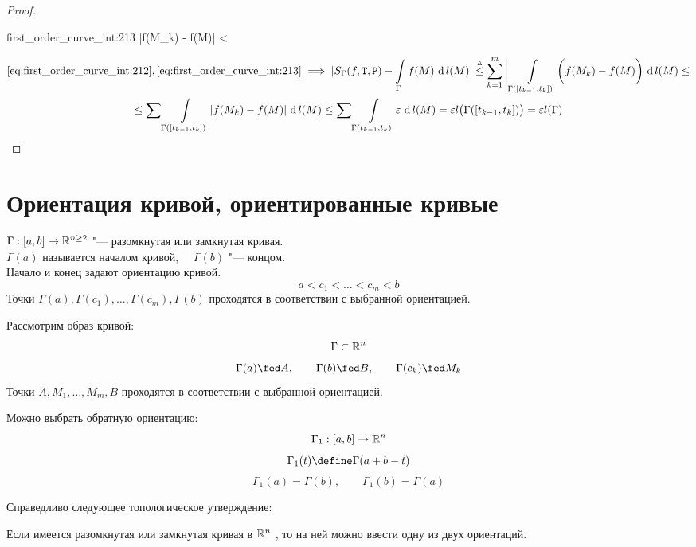 \begin{proof}
	\begin{equ}{first_order_curve_int:213}
		 \implies |f(M_k) - f(M)| < \veps
	\end{equ}
	\begin{multline*}
		\eref{first_order_curve_int:212}, \eref{first_order_curve_int:213} \implies |S_\Gamma(f, \Teq, \Par) - \cint\Gamma{f(M)}| \trile \sum_{k = 1}^m \bigg| \cint{\Gamma([t_{k - 1}, t_k])}{\bigg( f(M_k) - f(M) \bigg)} \le \\
		\le \sum \cint{\Gamma([t_{k - 1}, t_k])}{|f(M_k) - f(M)|} \le \sum \cint{\Gamma(t_{k - 1}, t_k)}\veps = \veps l \big( \Gamma([t_{k - 1}, t_k]) \big) = \veps l(\Gamma)
	\end{multline*}
\end{proof}

\section{Ориентация кривой, ориентированные кривые}

\begin{definition}
	$ \Gamma : [a, b] \to \mathbb{R}^{n \ge 2} $ "--- разомкнутая или замкнутая кривая. \\
	$ \Gamma(a) $ называется началом кривой, $ \quad \Gamma(b) $ "--- концом. \\
	Начало и конец задают ориентацию кривой.
	$$ a < c_1 < \dots < c_m < b $$
	Точки $ \Gamma(a), \Gamma(c_1), \dots, \Gamma(c_m), \Gamma(b) $ проходятся в соответствии с выбранной ориентацией.
\end{definition}

Рассмотрим образ кривой:
$$ \Gamma \subset \mathbb{R}^n $$
$$ \Gamma(a) \fed A, \qquad \Gamma(b) \fed B, \qquad \Gamma(c_k) \fed M_k $$
Точки $ A, M_1, \dots, M_m, B $ проходятся в соответствии с выбранной ориентацией.

Можно выбрать \soc обратную ориентацию:
$$ \Gamma_1 : [a, b] \to \mathbb{R}^n $$
$$ \Gamma_1(t) \define \Gamma(a + b - t) $$
$$ \Gamma_1(a) = \Gamma(b), \qquad \Gamma_1(b) = \Gamma(a) $$

Справедливо следующее топологическое утверждение:

\begin{theorem}
	Если имеется разомкнутая или замкнутая кривая в $ \mathbb{R}^n $ , то на ней можно ввести одну из двух ориентаций.
\end{theorem}

\begin{noproof}
\end{noproof}

